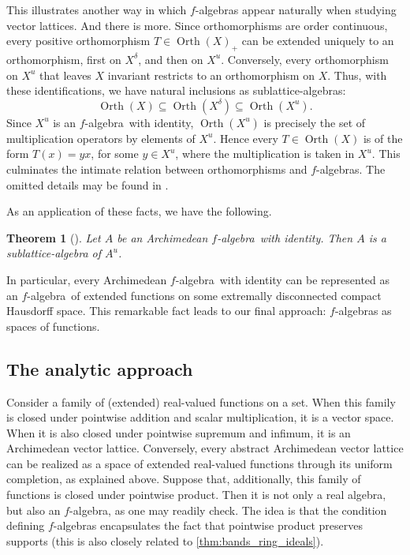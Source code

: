 \documentclass{memo-l}
\newtheorem{thm}[theorem]{Theorem}
\theoremstyle{definition}
\theoremstyle{remark}
\numberwithin{section}{chapter}
\numberwithin{equation}{chapter}
\newcommand{\falg}{$f\!$-algebra}
\newcommand{\orth}[1]{\operatorname{Orth}(#1)}
\begin{document}
This illustrates another way in which \falg s appear naturally when
studying vector lattices. And there is more. Since orthomorphisms are
order continuous, every positive
orthomorphism $T \in \orth{X}_+$ can be extended uniquely to an
orthomorphism, first on $X^{\delta }$, and then on
$X^{u}$. Conversely, every orthomorphism on $X^{u}$ that leaves $X$
invariant restricts to an orthomorphism on $X$. Thus, with these
identifications, we have natural inclusions as sublattice-algebras:
\[
    \orth X \subseteq \orth{X^{\delta }} \subseteq \orth{X^{u}}.
\]
Since $X^{u}$ is an \falg\ with identity, $\orth{X^{u}}$
is precisely the set of multiplication operators by elements of $X^{u}$.
Hence every $T \in \orth X$ is of the form $T(x)=yx$, for some $y
\in X^{u}$, where the multiplication is taken in $X^{u}$. This culminates
the intimate relation between orthomorphisms and
\falg s. The omitted details may be found in \cite[Theorem
2.63]{aliprantis_burkinshaw2006}.

As an application of these facts, we have the following.

\begin{thm}[{\cite[Theorem 2.64]{aliprantis_burkinshaw2006}}]
    \label{thm:repr_identity}
    Let $A$ be an Archimedean \falg\ with identity. Then $A$ is a
    sublattice-algebra of $A^{u}$.
\end{thm}

In particular, every Archimedean \falg\ with identity can be
represented as an \falg\ of extended functions on some extremally
disconnected compact Hausdorff space. This remarkable fact leads to
our final approach: \falg s as spaces of functions.

\subsection{The analytic approach}\label{sec:background_analytic}

Consider a family of (extended) real-valued functions on a set. When this family
is closed under pointwise addition and scalar multiplication, it is a
vector space. When it is also closed under pointwise supremum and
infimum, it is an Archimedean vector lattice. Conversely, every abstract
Archimedean vector
lattice can be realized as a space of extended real-valued functions through its uniform
completion, as explained above. Suppose that, additionally, this
family of functions is closed under pointwise product. Then it is not only a real
algebra, but also an \falg, as one may readily check. The idea is that
the condition defining \falg s encapsulates the fact that pointwise
product preserves supports (this is also closely related to \cref{thm:bands_ring_ideals}).
\end{document}
